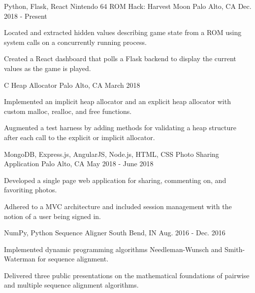 
\begin{cventries}

  \cventry
    {Python, Flask, React}
    {Nintendo 64 ROM Hack: Harvest Moon}
    {Palo Alto, CA}
    {Dec. 2018 - Present}
    {
      \begin{cvitems}
        \item {Located and extracted hidden values describing game state from a ROM using system calls on a concurrently running process.}
        \item{Created a React dashboard that polls a Flask backend to display the current values as the game is played.}
      \end{cvitems} 
    }
    
  \cventry
    {C}
    {Heap Allocator}
    {Palo Alto, CA}
    {March 2018}
    {
      \begin{cvitems}
        \item {Implemented an implicit heap allocator and an explicit heap allocator with custom malloc, realloc, and free functions.}
        \item {Augmented a test harness by adding methods for validating a heap structure after each call to the explicit or implicit allocator.}
      \end{cvitems}
    }

  \cventry
    {MongoDB, Express.js, AngularJS, Node.js, HTML, CSS}
    {Photo Sharing Application}
    {Palo Alto, CA}
    {May 2018 - June 2018}
    {
      \begin{cvitems}
        \item {Developed a single page web application for sharing, commenting on, and favoriting photos.}
        \item {Adhered to a MVC architecture and included session management with the notion of a user being signed in.}
      \end{cvitems} 
    }

  \cventry
    {NumPy, Python}
    {Sequence Aligner}
    {South Bend, IN}
    {Aug. 2016 - Dec. 2016}
    {
      \begin{cvitems}
        \item {Implemented dynamic programming algorithms Needleman-Wunsch and Smith-Waterman for sequence alignment.}
        \item {Delivered three public presentations on the mathematical foundations of pairwise and multiple sequence alignment algorithms.}
      \end{cvitems} 
    }
    
\end{cventries}